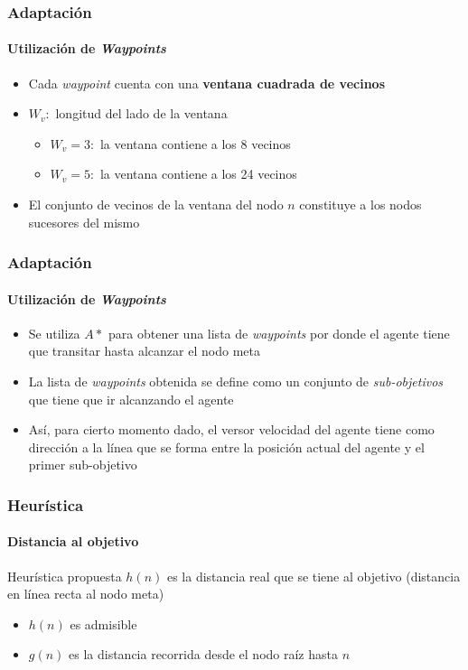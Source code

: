 \documentclass[hyperref={pdfpagelayout=SinglePage}]{beamer}
\begin{document}
\begin{frame}
\frametitle{Adaptación}
\framesubtitle{Utilización de \textit{Waypoints}}
\begin{itemize}
	\item Cada \textit{waypoint} cuenta con una \textbf{ventana cuadrada de vecinos}
	\item $W_{v} :$ longitud del lado de la ventana
	\begin{itemize}
		\item $W_{v} = 3 :$ la ventana contiene a los 8 vecinos
		\item $W_{v} = 5 :$ la ventana contiene a los 24 vecinos
	\end{itemize}
	\item El conjunto de vecinos de la ventana del nodo $n$ constituye a los nodos sucesores del mismo
\end{itemize}
\end{frame}

\begin{frame}
\frametitle{Adaptación}
\framesubtitle{Utilización de \textit{Waypoints}}
\begin{itemize}
	\item Se utiliza $A*$ para obtener una lista de \textit{waypoints} por donde el agente tiene que transitar hasta alcanzar el nodo meta
	\item La lista de \textit{waypoints} obtenida se define como un conjunto de \textit{sub-objetivos} que tiene que ir alcanzando el agente
	\item Así, para cierto momento dado, el versor velocidad del agente tiene como dirección a la línea que se forma entre la posición actual del agente y el primer sub-objetivo
\end{itemize}
\end{frame}

\begin{frame}
\frametitle{Heurística}
\framesubtitle{Distancia al objetivo}
\begin{block}{Heurística propuesta}
$h(n)$ es la distancia real que se tiene al objetivo (distancia en línea recta al nodo meta)
\end{block}
\begin{itemize}
	\item $h(n)$ es admisible
	\item $g(n)$ es la distancia recorrida desde el nodo raíz hasta $n$
\end{itemize}
\end{frame}
\end{document}
